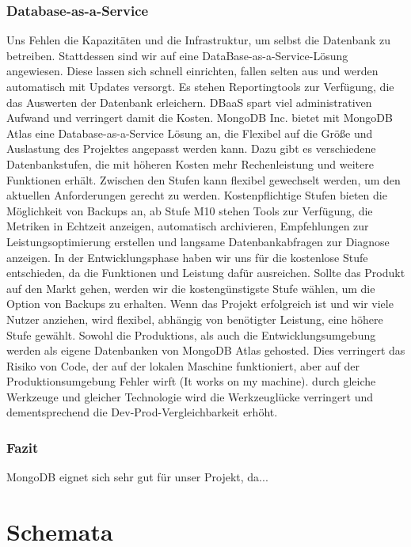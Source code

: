 \subsubsection{Database-as-a-Service}
Uns Fehlen die Kapazitäten und die Infrastruktur, um selbst die Datenbank zu betreiben. Stattdessen sind wir auf eine DataBase-as-a-Service-Lösung angewiesen. Diese lassen sich schnell einrichten, fallen selten aus und werden automatisch mit Updates versorgt. Es stehen Reportingtools zur Verfügung, die das Auswerten der Datenbank erleichern. DBaaS spart viel administrativen Aufwand und verringert damit die Kosten.
MongoDB Inc. bietet mit MongoDB Atlas eine Database-as-a-Service Lösung an, die Flexibel auf die Größe und Auslastung des Projektes angepasst werden kann. Dazu gibt es verschiedene Datenbankstufen, die mit höheren Kosten mehr Rechenleistung und weitere Funktionen erhält. Zwischen den Stufen kann flexibel gewechselt werden, um den aktuellen Anforderungen gerecht zu werden. Kostenpflichtige Stufen bieten die Möglichkeit von Backups an, ab Stufe M10 stehen Tools zur Verfügung, die Metriken in Echtzeit anzeigen, automatisch archivieren, Empfehlungen zur Leistungsoptimierung erstellen und langsame Datenbankabfragen zur Diagnose anzeigen. In der Entwicklungsphase haben wir uns für die kostenlose Stufe entschieden, da die Funktionen und Leistung dafür ausreichen. Sollte das Produkt auf den Markt gehen, werden wir die kostengünstigste Stufe wählen, um die Option von Backups zu erhalten. Wenn das Projekt erfolgreich ist und wir viele Nutzer anziehen, wird flexibel, abhängig von benötigter Leistung, eine höhere Stufe gewählt.
Sowohl die Produktions, als auch die Entwicklungsumgebung werden als eigene Datenbanken von MongoDB Atlas gehosted. Dies verringert das Risiko von Code, der auf der lokalen Maschine funktioniert, aber auf der Produktionsumgebung Fehler wirft (\glqq It works on my machine\grqq). durch gleiche Werkzeuge und gleicher Technologie wird die Werkzeuglücke verringert und dementsprechend die Dev-Prod-Vergleichbarkeit erhöht. \cite{12FA1}

\subsubsection{Fazit}
MongoDB eignet sich sehr gut für unser Projekt, da...

\section{Schemata}

